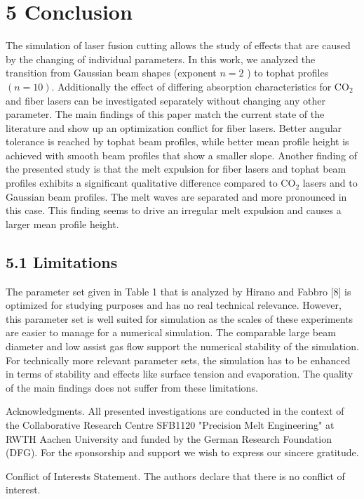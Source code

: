 \documentclass[10pt]{article}
\begin{document}
\section*{5 Conclusion}
The simulation of laser fusion cutting allows the study of effects that are caused by the changing of individual parameters. In this work, we analyzed the transition from Gaussian beam shapes (exponent $n=2$ ) to tophat profiles $(n=10)$. Additionally the effect of differing absorption characteristics for $\mathrm{CO}_{2}$ and fiber lasers can be investigated separately without changing any other parameter. The main findings of this paper match the current state of the literature and show up an optimization conflict for fiber lasers. Better angular tolerance is reached by tophat beam profiles, while better mean profile height is achieved with smooth beam profiles that show a smaller slope. Another finding of the presented study is that the melt expulsion for fiber lasers and tophat beam profiles exhibits a significant qualitative difference compared to $\mathrm{CO}_{2}$ lasers and to Gaussian beam profiles. The melt waves are separated and more pronounced in this case. This finding seems to drive an irregular melt expulsion and causes a larger mean profile height.

\subsection*{5.1 Limitations}
The parameter set given in Table 1 that is analyzed by Hirano and Fabbro [8] is optimized for studying purposes and has no real technical relevance. However, this parameter set is well suited for simulation as the scales of these experiments are easier to manage for a numerical simulation. The comparable large beam diameter and low assist gas flow support the numerical stability of the simulation. For technically more relevant parameter sets, the simulation has to be enhanced in terms of stability and effects like surface tension and evaporation. The quality of the main findings does not suffer from these limitations.

Acknowledgments. All presented investigations are conducted in the context of the Collaborative Research Centre SFB1120 "Precision Melt Engineering" at RWTH Aachen University and funded by the German Research Foundation (DFG). For the sponsorship and support we wish to express our sincere gratitude.

Conflict of Interests Statement. The authors declare that there is no conflict of interest.
\end{document}

